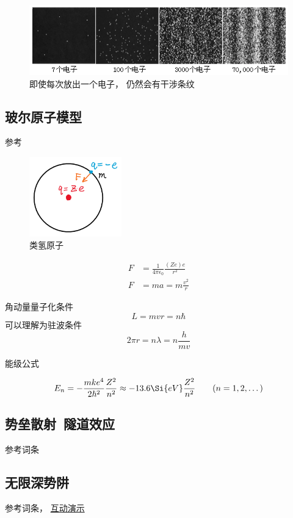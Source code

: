 \begin{figure}[ht]
\centering
\includegraphics[width=12cm]{./figures/QMIntr3.png}
\caption{即使每次放出一个电子， 仍然会有干涉条纹} \label{QMIntr_fig3}
\end{figure}

\subsection{玻尔原子模型}

参考

\begin{figure}[ht]
\centering
\includegraphics[width=4cm]{./figures/QMIntr1.png}
\caption{类氢原子} \label{QMIntr_fig1}
\end{figure}

\begin{equation}
\begin{aligned}
F &= \frac{1}{4\pi \epsilon_0} \frac{(Ze)e}{r^2}
\\
F &= ma = m\frac{v^2}{r}
\end{aligned}
\end{equation}

角动量量子化条件
\begin{equation}
L = mvr = n\hbar
\end{equation}
可以理解为驻波条件
\begin{equation}
2\pi r = n \lambda = n \frac{h}{mv}
\end{equation}

能级公式

\begin{equation}
E_n =  - \frac{m k e^4}{2 \hbar ^2} \frac{Z^2}{n^2} \approx - 13.6\Si{eV} \frac{Z^2}{n^2}
\qquad (n = 1, 2, \dots)
\end{equation}

\subsection{势垒散射\ 隧道效应}
参考词条

\subsection{无限深势阱}
参考词条， \href{http://wuli.wiki/apps/QMISW.html}{互动演示}
